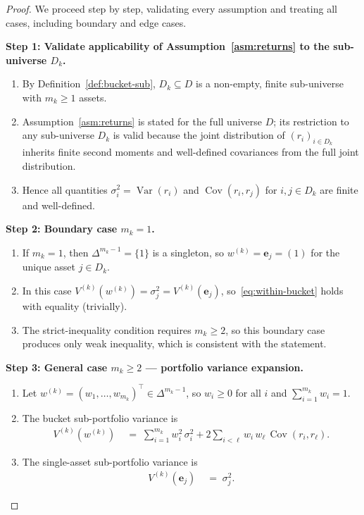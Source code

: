 \documentclass[12pt,openany]{book}
\newcommand{\bfw}{\mathbf{w}}
\newcommand{\bfe}{\mathbf{e}}
\newcommand{\calD}{\mathcal{D}}
\DeclareMathOperator{\Var}{Var}
\DeclareMathOperator{\Cov}{Cov}
\numberwithin{equation}{chapter}
\theoremstyle{plain}
\theoremstyle{definition}
\theoremstyle{remark}
\def\calD{D}%
\def\mathcal#1{#1}%
\def\bfw{w}%
\begin{document}
\begin{proof}
We proceed step by step, validating every assumption and treating
all cases, including boundary and edge cases.

\medskip
\noindent\textbf{Step 1: Validate applicability of
Assumption~\ref{asm:returns} to the sub-universe $\calD_k$.}

\begin{enumerate}
  \item By Definition~\ref{def:bucket-sub}, $\calD_k \subseteq \calD$
        is a non-empty, finite sub-universe with $m_k \geq 1$ assets.
  \item Assumption~\ref{asm:returns} is stated for the full universe
        $\calD$; its restriction to any sub-universe $\calD_k$ is
        valid because the joint distribution of
        $(r_i)_{i \in \calD_k}$ inherits finite second moments and
        well-defined covariances from the full joint distribution.
  \item Hence all quantities $\sigma_i^2 = \Var(r_i)$ and
        $\Cov(r_i, r_j)$ for $i, j \in \calD_k$ are finite and
        well-defined.
\end{enumerate}

\medskip
\noindent\textbf{Step 2: Boundary case $m_k = 1$.}

\begin{enumerate}
  \item If $m_k = 1$, then $\Delta^{m_k - 1} = \{1\}$ is a
        singleton, so $\bfw^{(k)} = \bfe_j = (1)$ for the unique
        asset $j \in \calD_k$.
  \item In this case $V^{(k)}(\bfw^{(k)}) = \sigma_j^2 =
        V^{(k)}(\bfe_j)$, so~\eqref{eq:within-bucket} holds with
        equality (trivially).
  \item The strict-inequality condition requires $m_k \geq 2$, so
        this boundary case produces only weak inequality, which is
        consistent with the statement.
\end{enumerate}

\medskip
\noindent\textbf{Step 3: General case $m_k \geq 2$ ---
portfolio variance expansion.}

\begin{enumerate}
  \item Let $\bfw^{(k)} = (w_1, \ldots, w_{m_k})^\top \in
        \Delta^{m_k - 1}$, so $w_i \geq 0$ for all $i$ and
        $\sum_{i=1}^{m_k} w_i = 1$.
  \item The bucket sub-portfolio variance is
        \begin{align}
          V^{(k)}(\bfw^{(k)})
          &\;=\; \sum_{i=1}^{m_k} w_i^2\,\sigma_i^2
                 + 2\sum_{i < \ell} w_i\,w_\ell\,\Cov(r_i, r_\ell).
          \label{eq:vk-expand}
        \end{align}
  \item The single-asset sub-portfolio variance is
        \begin{align}
          V^{(k)}(\bfe_j) &\;=\; \sigma_j^2.
          \label{eq:vk-single}
        \end{align}
\end{enumerate}


\end{proof}
\end{document}
